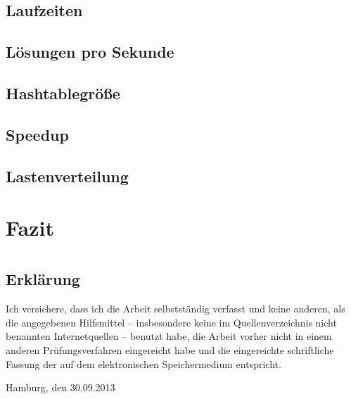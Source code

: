 \documentclass[
	12pt,
	a4paper,
	BCOR10mm,
	DIV14,
	listof=totoc,
	bibliography=totoc,
	headsepline
]{scrreprt}
\begin{document}
\section{Laufzeiten}

\section{Lösungen pro Sekunde}

\section{Hashtablegröße}

\section{Speedup}

\section{Lastenverteilung}


\chapter{Fazit}
\label{Fazit}


\newpage

\thispagestyle{empty}

\chapter*{}

\section*{Erklärung}

Ich versichere, dass ich die Arbeit selbstständig verfasst und keine anderen, als die angegebenen Hilfsmittel -- insbesondere keine im Quellenverzeichnis nicht benannten Internetquellen -- benutzt habe, die Arbeit vorher nicht in einem anderen Prüfungsverfahren eingereicht habe und die eingereichte schriftliche Fassung der auf dem elektronischen Speichermedium entspricht.

\smallskip

\bigskip
\bigskip
\bigskip

Hamburg, den 30.09.2013  \quad \dotfill
\end{document}
